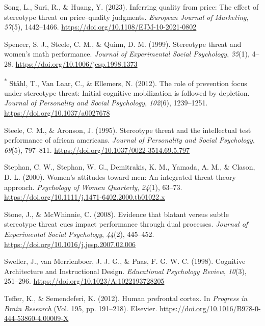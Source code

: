 \documentclass[
  stu, a4paper,floatsintext]{apa7}
\newlength{\cslhangindent}
\newenvironment{CSLReferences}[2] %
 {\begin{list}{}{%
  \setlength{\itemindent}{0pt}
  \setlength{\leftmargin}{0pt}
  \setlength{\parsep}{0pt}
  \ifodd #1
   \setlength{\leftmargin}{\cslhangindent}
   \setlength{\itemindent}{-1\cslhangindent}
  \fi
  \setlength{\itemsep}{#2\baselineskip}}}
 {\end{list}}
\begin{document}
\begin{CSLReferences}{1}{0}
Song, L., Suri, R., \& Huang, Y. (2023). Inferring quality from price: The effect of stereotype threat on price--quality judgments. \emph{European Journal of Marketing}, \emph{57}(5), 1442--1466. \url{https://doi.org/10.1108/EJM-10-2021-0802}

Spencer, S. J., Steele, C. M., \& Quinn, D. M. (1999). Stereotype threat and women's math performance. \emph{Journal of Experimental Social Psychology}, \emph{35}(1), 4--28. \url{https://doi.org/10.1006/jesp.1998.1373}

\textsuperscript{*} Ståhl, T., Van Laar, C., \& Ellemers, N. (2012). The role of prevention focus under stereotype threat: {Initial} cognitive mobilization is followed by depletion. \emph{Journal of Personality and Social Psychology}, \emph{102}(6), 1239--1251. \url{https://doi.org/10.1037/a0027678}

Steele, C. M., \& Aronson, J. (1995). Stereotype threat and the intellectual test performance of african americans. \emph{Journal of Personality and Social Psychology}, \emph{69}(5), 797--811. \url{https://doi.org/10.1037/0022-3514.69.5.797}

Stephan, C. W., Stephan, W. G., Demitrakis, K. M., Yamada, A. M., \& Clason, D. L. (2000). Women's attitudes toward men: An integrated threat theory approach. \emph{Psychology of Women Quarterly}, \emph{24}(1), 63--73. \url{https://doi.org/10.1111/j.1471-6402.2000.tb01022.x}

Stone, J., \& McWhinnie, C. (2008). Evidence that blatant versus subtle stereotype threat cues impact performance through dual processes. \emph{Journal of Experimental Social Psychology}, \emph{44}(2), 445--452. \url{https://doi.org/10.1016/j.jesp.2007.02.006}

Sweller, J., van Merrienboer, J. J. G., \& Paas, F. G. W. C. (1998). Cognitive {Architecture} and {Instructional Design}. \emph{Educational Psychology Review}, \emph{10}(3), 251--296. \url{https://doi.org/10.1023/A:1022193728205}

Teffer, K., \& Semendeferi, K. (2012). Human prefrontal cortex. In \emph{Progress in {Brain Research}} (Vol. 195, pp. 191--218). Elsevier. \url{https://doi.org/10.1016/B978-0-444-53860-4.00009-X}


\end{CSLReferences}
\end{document}
